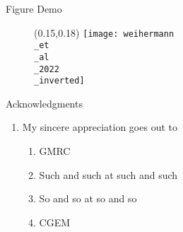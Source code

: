 \documentclass[aspectratio=169]{beamer}
\begin{document}
  \begin{frame}{Figure Demo}
    \begin{figure}
      \begin{textblock*}{0.7\paperwidth}(0.15\paperwidth,0.18\paperheight)
        \texttt{[image: weihermann\\\_et\\\_al\\\_2022\\\_inverted]}
      \end{textblock*}
    \end{figure}
  \end{frame}
 
  \begin{frame}{Acknowledgments}
    \vspace{-2cm}
    \begin{enumerate}
      \item My sincere appreciation goes out to
      \begin{enumerate}
        \item GMRC
        \item Such and such at such and such
        \item So and so at so and so
        \item CGEM 
      \end{enumerate}
    \end{enumerate}
  \end{frame}

  \questionslide
  
\end{document}
